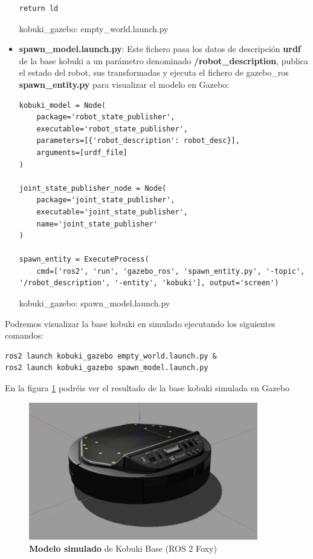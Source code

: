 \begin{itemize}
\begin{code}[H]
\begin{lstlisting}[frame=single]
	return ld
\end{lstlisting}
\caption[kobuki\_gazebo: empty\_world.launch.py]{kobuki\_gazebo: empty\_world.launch.py}
\label{cod:kobuki_gazebo_empty_world}
\end{code}

	\item \textbf{spawn\_model.launch.py}: Este fichero pasa los datos de descripción \textbf{urdf} de la base kobuki a un parámetro denominado \textbf{/robot\_description}, publica el estado del robot, sus transformadas y ejecuta el fichero de gazebo\_ros \textbf{spawn\_entity.py} para visualizar el modelo en Gazebo:
	
\begin{code}[H]
\begin{lstlisting}[frame=single]
kobuki_model = Node(
	package='robot_state_publisher',
	executable='robot_state_publisher',
	parameters=[{'robot_description': robot_desc}],
	arguments=[urdf_file]
)

joint_state_publisher_node = Node(
	package='joint_state_publisher',
	executable='joint_state_publisher',
	name='joint_state_publisher'
)

spawn_entity = ExecuteProcess(
	cmd=['ros2', 'run', 'gazebo_ros', 'spawn_entity.py', '-topic', '/robot_description', '-entity', 'kobuki'], output='screen')
\end{lstlisting}
\caption[kobuki\_gazebo: spawn\_model.launch.py]{kobuki\_gazebo: spawn\_model.launch.py}
\label{cod:kobuki_gazebo_spawn_model}
\end{code}
\end{itemize}


Podremos visualizar la base kobuki en simulado ejecutando los siguientes comandos:\\
\begin{lstlisting}
ros2 launch kobuki_gazebo empty_world.launch.py &
ros2 launch kobuki_gazebo spawn_model.launch.py
\end{lstlisting}

En la figura \ref{fig:sim_kobuki_base} podréis ver el resultado de la base kobuki simulada en Gazebo
\begin{figure} [H]
  \begin{center}
    \includegraphics[width=10cm]{imagenes/sim_kobuki_base.png}
  \end{center}
  \caption[\textbf{Modelo simulado} de Kobuki Base (ROS 2 Foxy)]{\textbf{Modelo simulado} de Kobuki Base (ROS 2 Foxy)}
  \label{fig:sim_kobuki_base}
\end{figure}




